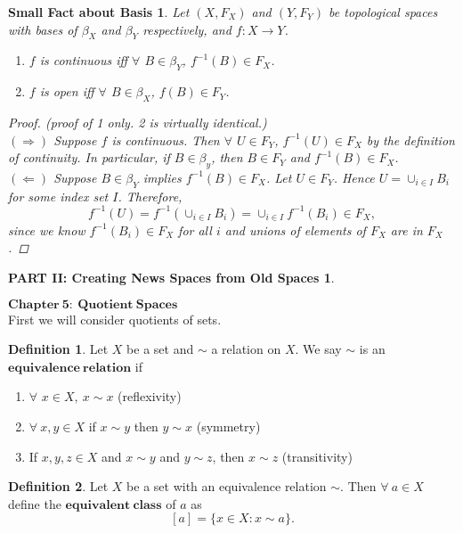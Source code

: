 \documentclass[10pt,reqno]{amsart}
\newtheorem*{Small Fact}{Small Fact}
\newtheorem*{Small Fact about Basis}{Small Fact about Basis}
\newtheorem*{Tiny Fact about Projection Maps}{Tiny Fact about Projection Maps}
\theoremstyle{definition}
\newtheorem*{Definition}{Definition}
\newtheorem{PART II: Creating News Spaces from Old Spaces}{PART II: Creating News Spaces from Old Spaces}
\begin{document}
\begin{Small Fact about Basis} 
Let $(X, F_X)$ and $(Y, F_Y)$ be topological spaces with bases of $\beta_X$ and $\beta_Y$ respectively, and $f: X \rightarrow Y$. 
\begin{enumerate}
	\item $f$ is continuous iff $\forall$ $B \in \beta_Y$, $f^{-1}(B) \in F_X$. 
	\item $f$ is open iff $\forall$ $B \in \beta_X$, $f(B) \in F_Y$.
\end{enumerate}
\begin{proof}
(proof of 1 only. 2 is virtually identical.)\\
$(\Rightarrow)$ Suppose $f$ is continuous. Then $\forall$ $U \in F_Y$, $f^{-1}(U) \in F_X$ by the definition of continuity. In particular, if $B \in \beta_y$, then $B \in F_Y$ and $f^{-1}(B) \in F_X$. \\
$(\Leftarrow)$ Suppose $B \in \beta_Y$ implies $f^{-1}(B) \in F_X$. Let $U \in F_Y$. Hence $U = \cup_{i \in I} B_i$ for some index set $I$. Therefore,
$$f^{-1}(U) = f^{-1}(\cup_{i \in I} B_i) = \cup_{i \in I} f^{-1}(B_i) \in F_X,$$ 
since we know $f^{-1}(B_i) \in F_X$ for all $i$ and unions of elements of $F_X$ are in $F_X$. 
\end{proof}
\end{Small Fact about Basis}
\bigskip

\begin{PART II: Creating News Spaces from Old Spaces}
\end{PART II: Creating News Spaces from Old Spaces}
$\mathbf{Chapter \ 5: \ Quotient \ Spaces}$ \\
First we will consider quotients of sets.
\begin{Definition}
Let $X$ be a set and $\sim$ a relation on $X$. We say $\sim$ is an $\mathbf{equivalence \ relation}$ if 
\begin{enumerate}
	\item $\forall$ $x \in X, \ x\sim x$ (reflexivity)
	\item $\forall \ x, y \in X$ if $x\sim y$ then $y\sim x$ (symmetry)
	\item If $x, y, z \in X$ and $x\sim y$ and $y\sim z$, then $x\sim z$ (transitivity)
\end{enumerate}
\end{Definition}

\begin{Definition}
Let $X$ be a set with an equivalence relation $\sim$. Then $\forall \ a \in X$ define the $\mathbf{equivalent \ class}$ of $a$ as $$[a] = \{x \in X : x\sim a \}.$$
\end{Definition}
\end{document}
